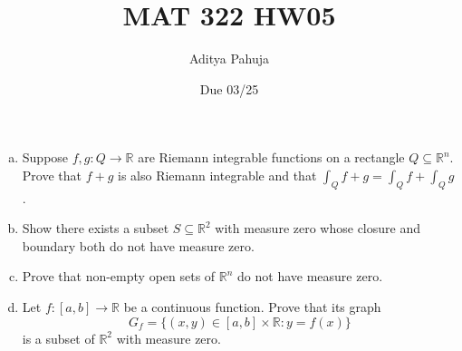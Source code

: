 \documentclass[10pt]{scrartcl}
\title{\vspace{-2em}MAT 322 HW05}
\author{\large Aditya Pahuja}
\date{\large Due 03/25}
\providecommand{\RR}{\mathbb R}
\providecommand{\ii}{\item}
\begin{document}
\maketitle

\begin{problem}
	\begin{enumerate}[(a)]
		\ii Suppose $f,g\colon Q\to\RR$ are Riemann integrable functions
		on a rectangle $Q\subseteq\RR^n$. Prove that
		$f+g$ is also Riemann integrable and that
		$\int_Qf+g=\int_Qf+\int_Qg$.
		\ii Show there exists a subset $S\subseteq\RR^2$ with measure zero
		whose closure and boundary both do not have measure zero.
		\ii Prove that non-empty open sets of $\RR^n$ do not have measure zero.
		\ii Let $f\colon[a,b]\to\RR$ be a continuous function.
		Prove that its graph
		\[G_f = \{(x,y)\in[a,b]\times\RR : y = f(x)\}\]
		is a subset of $\RR^2$ with measure zero.
	\end{enumerate}
\end{problem}
\end{document}
